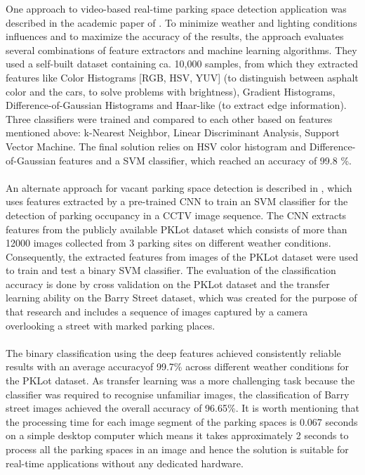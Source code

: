 \documentclass[12pt]{article}
\begin{document}
One approach to video-based real-time parking space detection application 
was described in the academic paper of \cite{tschentscher}. To minimize 
weather and lighting conditions influences and to maximize the accuracy of the 
results, the approach evaluates several combinations of feature extractors and 
machine learning algorithms. They used a self-built dataset containing 
ca. 10,000 samples, from which they extracted features like 
Color Histograms [RGB, HSV, YUV] (to distinguish between asphalt color and the 
cars, to solve problems with brightness), Gradient Histograms, 
Difference-of-Gaussian Histograms and Haar-like (to extract edge information). 
Three classifiers were trained and compared to each other based on features 
mentioned above: k-Nearest Neighbor, Linear Discriminant Analysis, Support 
Vector Machine. The final solution relies on HSV color histogram and 
Difference-of-Gaussian features and a SVM classifier, which reached an 
accuracy of 99.8 \%.\\\\
An alternate approach for vacant parking space detection is described in \cite{debaditya}, which uses features extracted by a pre-trained CNN to train an SVM classifier for the detection of parking occupancy in a CCTV image sequence.
The CNN extracts features from the publicly available PKLot dataset which consists of more than 12000 images collected from 3 parking sites on different weather conditions. 
Consequently, the extracted features from images of the PKLot dataset were used to train and test a binary SVM classifier.
The evaluation of the classification accuracy is done by cross validation on the PKLot dataset and the transfer learning ability on the Barry Street dataset, which was created for the purpose of that research and includes a sequence of images captured by a camera overlooking a street with marked parking places.\\\\
The binary classification using the deep features achieved consistently reliable results with an average accuracyof 99.7\% across different weather conditions for the PKLot dataset.
As transfer learning was a more challenging task because the classifier was required to recognise unfamiliar images, the classification of Barry street images achieved the overall accuracy of 96.65\%.
It is worth mentioning that the processing time for each image segment of the parking spaces is 0.067 seconds on a simple desktop computer which means it takes approximately 2 seconds to process all the parking spaces in an image and hence the solution is suitable for real-time applications without any dedicated hardware.



\end{document}
